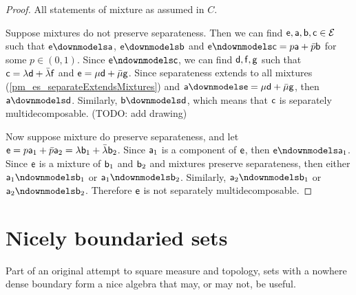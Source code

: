 \begin{proof}
	All statements of mixture as assumed in $C$.
	
	Suppose mixtures do not preserve separateness. Then we can find $\ens,\ens[a],\ens[b], \ens[c] \in \Ens$ such that $\ens \separate \ens[a]$, $\ens \separate \ens[b]$ and $\ens \nseparate \ens[c] = p \ens[a] + \bar{p} \ens[b]$ for some $p \in (0,1)$. Since $\ens \nseparate \ens[c]$, we can find $\ens[d], \ens[f], \ens[g]$ such that $\ens[c] = \lambda \ens[d] + \bar{\lambda} \ens[f]$ and $\ens = \mu \ens[d] + \bar{\mu} \ens[g]$.  Since separateness extends to all mixtures (\ref{pm_es_separateExtendsMixtures}) and $\ens[a] \separate \ens[e] = \mu \ens[d] + \bar{\mu} \ens[g]$, then $\ens[a] \separate \ens[d]$. Similarly, $\ens[b] \separate \ens[d]$, which means that $\ens[c]$ is separately multidecomposable. (TODO: add drawing)
	
	Now suppose mixture do preserve separateness, and let $\ens = p \ens[a]_1 + \bar{p} \ens[a]_2 = \lambda \ens[b]_1 +\bar{\lambda} \ens[b]_2$. Since $\ens[a]_1$ is a component of $\ens$, then $\ens \nseparate \ens[a]_1$. Since $\ens$ is a mixture of $\ens[b]_1$ and $\ens[b]_2$ and mixtures preserve separateness, then either $\ens[a]_1 \nseparate \ens[b]_1$ or $\ens[a]_1 \nseparate \ens[b]_2$. Similarly, $\ens[a]_2 \nseparate \ens[b]_1$ or $\ens[a]_2 \nseparate \ens[b]_2$. Therefore $\ens$ is not separately multidecomposable.
\end{proof}

\section{Nicely boundaried sets}
Part of an original attempt to square measure and topology, sets with a nowhere dense boundary form a nice algebra that may, or may not, be useful.

